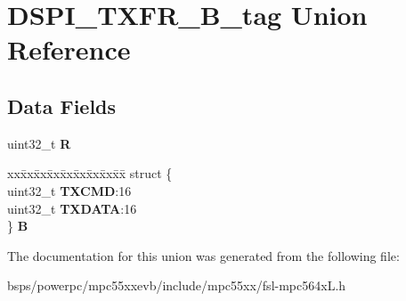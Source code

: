 \hypertarget{unionDSPI__TXFR__32B__tag}{}\section{D\+S\+P\+I\+\_\+\+T\+X\+F\+R\+\_\+B\+\_\+tag Union Reference}
\label{unionDSPI__TXFR__32B__tag}
\subsection*{Data Fields}
\begin{DoxyCompactItemize}
\item 
\mbox{\label{unionDSPI__TXFR__32B__tag_a91cfe430dac8ac712f1b92b52ba9e8c0}} 
uint32\+\_\+t {\bfseries R}
\item 
\mbox{\label{unionDSPI__TXFR__32B__tag_aee49450cbbb293bc9c2b691c44c7dfdb}} 
\begin{tabbing}
xx\=xx\=xx\=xx\=xx\=xx\=xx\=xx\=xx\=\kill
struct \{\\
\>uint32\_t {\bfseries TXCMD}:16\\
\>uint32\_t {\bfseries TXDATA}:16\\
\} {\bfseries B}\\

\end{tabbing}\end{DoxyCompactItemize}


The documentation for this union was generated from the following file\+:\begin{DoxyCompactItemize}
\item 
bsps/powerpc/mpc55xxevb/include/mpc55xx/fsl-\/mpc564x\+L.\+h\end{DoxyCompactItemize}
